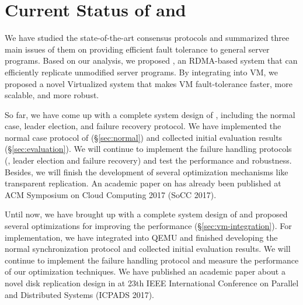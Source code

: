 \section{Current Status of \xxx and \yyy} \label{sec:status}
We have studied the state-of-the-art consensus protocols and summarized 
three main issues of them on providing efficient fault tolerance to 
general server programs. Based on our analysis, we proposed \xxx, an RDMA-based 
\paxos system that can efficiently replicate unmodified server programs.
By integrating \xxx into VM, we proposed a novel Virtualized \smr 
system \yyy that makes VM fault-tolerance faster, more scalable, and 
more robust.

So far, we have come up with a complete system design of \xxx, including the 
normal case, leader election, and failure recovery protocol. We have 
implemented the normal case protocol of \xxx (\S\ref{sec:normal}) and collected 
initial evaluation results (\S\ref{sec:evaluation}). We will continue to 
implement the failure handling protocols (\ie, leader election and failure 
recovery) and test the performance and robustness. Besides, we 
will finish the development of several optimization mechanisms like transparent 
replication. An academic paper on \xxx has already been published 
at ACM Symposium on Cloud Computing 2017 (SoCC 2017).

Until now, we have brought up with a complete system design of \yyy and 
proposed several optimizations for improving the 
performance (\S\ref{sec:vm-integration}). For implementation, we have integrated 
\xxx into \kvm QEMU and finished developing the normal synchronization protocol 
and collected initial evaluation results. We will continue to implement the 
failure handling protocol and measure the performance of our 
optimization techniques. We have published an academic paper about a novel disk 
replication design in \yyy at 23th IEEE International Conference on Parallel 
and Distributed Systems (ICPADS 2017).
